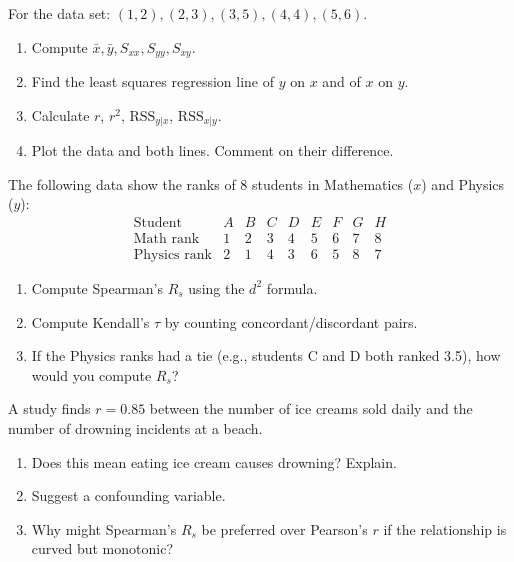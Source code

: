 \documentclass[11pt]{article}
\newcounter{popsec}
\newcounter{popsub}
\newcommand{\courssub}[1]{%
  \stepcounter{popsub}%
  \par\vspace{9pt}\noindent{\popxbold\fontsize{11.5}{13}\selectfont\color{popink}{\color{poporange}\thepopsec.\thepopsub}\hspace{6pt}#1}\par\nopagebreak\vspace{4pt}
}
\begin{document}
\courssub{Exercises}

\begin{exercice}
For the data set: $(1,2), (2,3), (3,5), (4,4), (5,6)$.
\begin{enumerate}
    \item Compute $\bar{x}, \bar{y}, S_{xx}, S_{yy}, S_{xy}$.
    \item Find the least squares regression line of $y$ on $x$ and of $x$ on $y$.
    \item Calculate $r$, $r^2$, $\text{RSS}_{y|x}$, $\text{RSS}_{x|y}$.
    \item Plot the data and both lines. Comment on their difference.
\end{enumerate}
\end{exercice}

\begin{exercice}
The following data show the ranks of 8 students in Mathematics ($x$) and Physics ($y$):
\[
\begin{array}{c|cccccccc}
\text{Student} & A & B & C & D & E & F & G & H \\
\hline
\text{Math rank} & 1 & 2 & 3 & 4 & 5 & 6 & 7 & 8 \\
\text{Physics rank} & 2 & 1 & 4 & 3 & 6 & 5 & 8 & 7
\end{array}
\]
\begin{enumerate}
    \item Compute Spearman's $R_s$ using the $d^2$ formula.
    \item Compute Kendall's $\tau$ by counting concordant/discordant pairs.
    \item If the Physics ranks had a tie (e.g., students C and D both ranked 3.5), how would you compute $R_s$?
\end{enumerate}
\end{exercice}

\begin{exercice}
A study finds $r = 0.85$ between the number of ice creams sold daily and the number of drowning incidents at a beach.
\begin{enumerate}
    \item Does this mean eating ice cream causes drowning? Explain.
    \item Suggest a confounding variable.
    \item Why might Spearman's $R_s$ be preferred over Pearson's $r$ if the relationship is curved but monotonic?
\end{enumerate}
\end{exercice}
\end{document}
